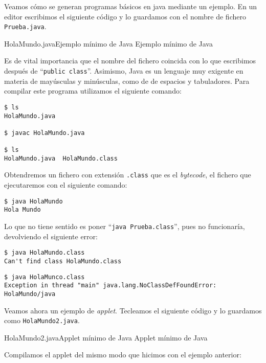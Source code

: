 Veamos cómo se generan programas  básicos en java mediante un ejemplo.
En un  editor escribimos  el siguiente  código y  lo guardamos  con el
nombre de fichero {\tt Prueba.java}.

\begin{ejemplo}{HolaMundo.java}{Ejemplo mínimo de Java}
Ejemplo mínimo de Java
\end{ejemplo}

Es de vital importancia que el  nombre del fichero coincida con lo que
escribimos después  de ``{\tt  public class}''.  Asimismo, Java  es un
lenguaje muy exigente  en materia de mayúsculas y  minúsculas, como de
de espacios y  tabuladores. Para compilar este  programa utilizamos el
siguiente comando:

\begin{verbatim}
$ ls
HolaMundo.java

$ javac HolaMundo.java

$ ls
HolaMundo.java  HolaMundo.class

\end{verbatim}


Obtendremos  un fichero  con extensión  {\tt  .class} que  es el  {\em
bytecode}, el fichero que ejecutaremos con el siguiente comando:

\begin{verbatim}
$ java HolaMundo
Hola Mundo
\end{verbatim}

Lo que no tiene sentido es poner ``{\tt  java  Prueba.class}'', pues no
funcionaría, devolviendo el siguiente error:

\begin{verbatim}
$ java HolaMundo.class
Can't find class HolaMundo.class
\end{verbatim}

\begin{verbatim}
$ java HolaMunco.class
Exception in thread "main" java.lang.NoClassDefFoundError: HolaMundo/java
\end{verbatim}

Veamos ahora un ejemplo de {\em applet}. Tecleamos el siguiente código
y lo guardamos como {\tt HolaMundo2.java}.

\begin{ejemplo}{HolaMundo2.java}{Applet mínimo de Java}
Applet mínimo de Java
\end{ejemplo}

Compilamos  el  applet del  mismo  modo  que  hicimos con  el  ejemplo
anterior:


